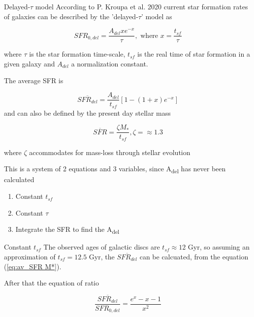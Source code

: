 \documentclass[presentation]{beamer}
\begin{document}
\begin{frame}[label={sec:org05089e9}]{Delayed-\(\tau\) model}
According to P. Kroupa et al. 2020\autocite{kroupaConstraintsStarFormation2020} current star formation rates of galaxies can be described by the 'delayed-\(\tau\)' model as


\begin{equation} \label{eq:SFR}
SFR_{0,del}=\frac{A_{del}xe^{-x}}{\tau},\text{ where } x=\frac{t_{sf}}{\tau}
\end{equation}

where \(\tau\) is the star formation time-scale,  \(t_{sf}\) is the real time of star formation in a given galaxy and \(A_{del}\) a normalization constant.

The average SFR is

\begin{equation}\label{eq:av_SFR-x}
\overline{SFR_{del}}=\frac{A_{del}}{t_{sf}}[1-(1+x)e^{-x}]
\end{equation}
and can also be defined by the present day stellar mass

\begin{equation}\label{eq:av_SFR M*}
    \overline{SFR}=\frac{\zeta M_*}{t_{sf}}, \zeta = \approx 1.3
\end{equation}

where \(\zeta\) accommodates for mass-loss through stellar evolution

This is a system of 2 equations and 3 variables, since A\textsubscript{del} has never been calculated


\begin{enumerate}
\item Constant \(t_{sf}\)
\item Constant \(\tau\)
\item Integrate the SFR to find the A\textsubscript{del}
\end{enumerate}

\begin{block}{Constant \(t_{sf}\)}
The observed ages of galactic discs are \(t_{sf}\approx 12\) Gyr\autocite{knoxSurveyCoolWhite1999}, so assuming an approximation of \(t_{sf}=12.5\) Gyr, the \(\overline{SFR_{del}}\) can be calcuated, from the equation (\ref{eq:av_SFR M*}).



After that the equation of ratio



\begin{equation} \label{eq:ratio}
    \frac{\overline{SFR_{del}}}{SFR_{0,del}}=\frac{e^x-x-1}{x^2}
\end{equation}


\end{block}
\end{frame}
\end{document}
